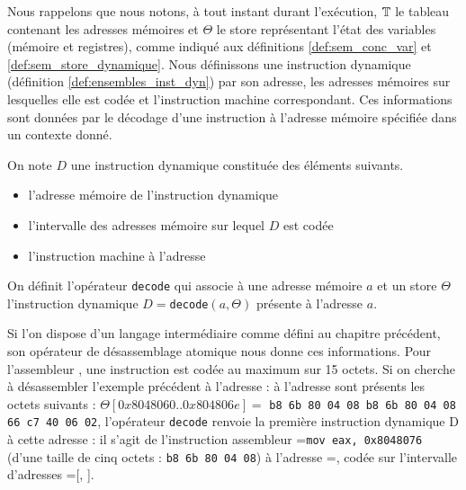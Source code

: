 Nous rappelons que nous notons, à tout instant durant l'exécution, $\mathbb T$ le tableau contenant les adresses mémoires et $\Theta$ le store représentant l'état des variables (mémoire et registres), comme indiqué aux définitions \ref{def:sem_conc_var} et \ref{def:sem_store_dynamique}.
Nous définissons une instruction dynamique (définition \ref{def:ensembles_inst_dyn}) par son adresse, les adresses mémoires sur lesquelles elle est codée et l'instruction machine correspondant. Ces informations sont données par le décodage d'une instruction à l'adresse mémoire spécifiée dans un contexte donné. 

\begin{defi}
On note $D$ une instruction dynamique constituée des éléments suivants.
\begin{itemize}
 \item {} l'adresse mémoire de l'instruction dynamique
 \item {} l'intervalle des adresses mémoire sur lequel $D$ est codée
 \item {} l'instruction machine à l'adresse 
\end{itemize}
On définit l'opérateur \texttt{decode} qui associe à une adresse mémoire $a$ et un store $\Theta$ l'instruction dynamique $D=$\texttt{decode}$(a, \Theta)$ présente à l'adresse $a$.
\label{def:ensembles_inst_dyn}
\end{defi}

Si l'on dispose d'un langage intermédiaire comme défini au chapitre précédent, son opérateur de désassemblage atomique nous donne ces informations. Pour l'assembleur \xq, une instruction est codée au maximum sur 15 octets.
Si on cherche à désassembler l'exemple précédent à l'adresse  : à l'adresse  sont présents les octets suivants : $\Theta[0x8048060..0x804806e]=$ \texttt{b8 6b 80 04 08 b8 6b 80 04 08 66 c7 40 06 02}, l'opérateur \texttt{decode} renvoie la première instruction dynamique D à cette adresse : il s'agit de l'instruction assembleur =\texttt{mov eax, 0x8048076} (d'une taille de cinq octets : \texttt{b8 6b 80 04 08}) à l'adresse =, codée sur l'intervalle d'adresses =[, ].

